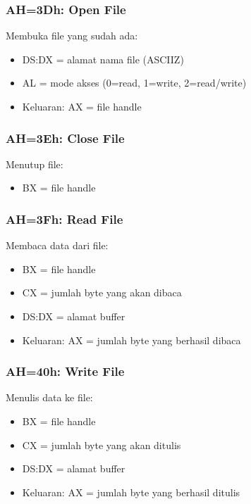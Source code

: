 \documentclass[../main.tex]{subfiles}
\begin{document}
            \subsubsection{AH=3Dh: Open File}
                Membuka file yang sudah ada:
                \begin{itemize}
                    \item DS:DX = alamat nama file (ASCIIZ)
                    \item AL = mode akses (0=read, 1=write, 2=read/write)
                    \item Keluaran: AX = file handle
                \end{itemize}

            \subsubsection{AH=3Eh: Close File}
                Menutup file:
                \begin{itemize}
                    \item BX = file handle
                \end{itemize}

            \subsubsection{AH=3Fh: Read File}
                Membaca data dari file:
                \begin{itemize}
                    \item BX = file handle
                    \item CX = jumlah byte yang akan dibaca
                    \item DS:DX = alamat buffer
                    \item Keluaran: AX = jumlah byte yang berhasil dibaca
                \end{itemize}

            \subsubsection{AH=40h: Write File}
                Menulis data ke file:
                \begin{itemize}
                    \item BX = file handle
                    \item CX = jumlah byte yang akan ditulis
                    \item DS:DX = alamat buffer
                    \item Keluaran: AX = jumlah byte yang berhasil ditulis
                \end{itemize}
\end{document}
